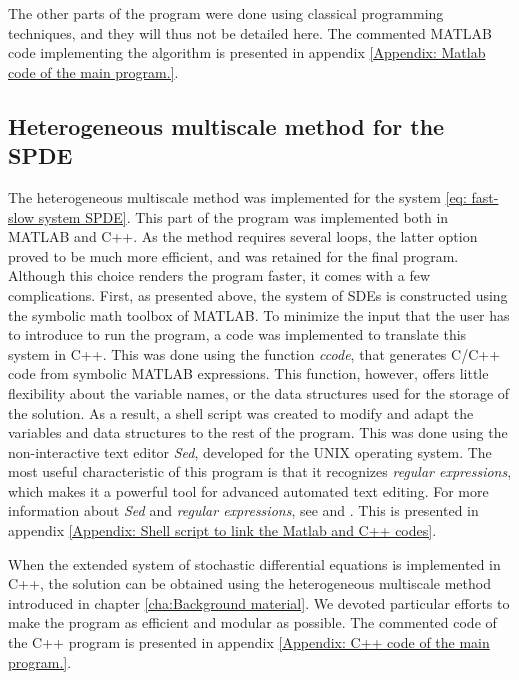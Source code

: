 The other parts of the program were done using classical programming techniques, and they will thus not be detailed here. The commented MATLAB code implementing the algorithm is presented in appendix \ref{Appendix: Matlab code of the main program.}.

\subsection{Heterogeneous multiscale method for the SPDE}
\label{sub:Heterogeneous multiscale method for the SPDE}
The heterogeneous multiscale method was implemented for the system
\eqref{eq: fast-slow system SPDE}. This part of the program was implemented both in
MATLAB and C++. As the method requires several loops, the latter option proved
to be much more efficient, and was retained for the final program. Although this
choice renders the program faster, it comes with a few complications. First, as
presented above, the system of SDEs is constructed using the symbolic math
toolbox of MATLAB. To minimize the input that the user has to introduce to run
the program, a code was implemented to translate this system in C++. This was
done using the function \emph{ccode}, that generates C/C++ code from symbolic
MATLAB expressions. This function, however, offers little flexibility about the
variable names, or the data structures used for the storage of the solution. As
a result, a shell script was created to modify and adapt the variables and
data structures to the rest of the program. This was done using the
non-interactive text editor \emph{Sed}, developed for the UNIX operating
system. The most useful characteristic of this program is that it recognizes
\emph{regular expressions}, which makes it a powerful tool for advanced
automated text editing. For more information about \emph{Sed} and \emph{regular
    expressions}, see \cite{mcmahon1979sed} and \cite{friedl2002mastering}. 
This is presented in appendix \ref{Appendix: Shell script to link the Matlab and C++ codes}.

When the extended system of stochastic differential equations is implemented in C++, the
solution can be obtained using the heterogeneous multiscale method introduced in
chapter \ref{cha:Background material}. We devoted particular efforts to make the program as 
efficient and modular as possible. The commented code of the C++
program is presented in appendix \ref{Appendix: C++ code of the main program.}.

